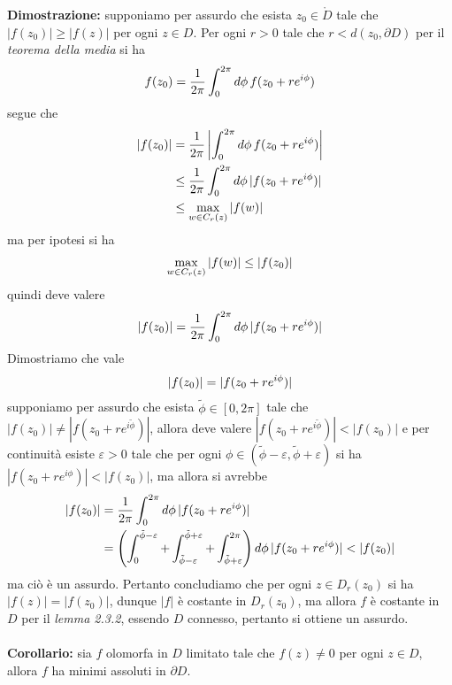 \documentclass{article}
\begin{document}
\textbf{Dimostrazione:} supponiamo per assurdo che esista $z_0 \in \mathring{D}$ tale che $|f(z_0)| \geq |f(z)|$ per ogni $z \in D$. Per ogni $r > 0$ tale che $r < d(z_0, \partial D)$ per il \textit{teorema della media}  si ha
\begin{gather}
    f(z_0) = \frac{1}{2\pi}\int_0^{2\pi}d\phi \, f(z_0 + re^{i\phi}) \notag
\end{gather}
segue che
\begin{align}
    |f(z_0)| &= \frac{1}{2\pi}\left|\int_0^{2\pi}d\phi \, f(z_0 + re^{i\phi})\right| \notag \\
    &\leq \frac{1}{2\pi}\int_0^{2\pi}d\phi \, |f(z_0 + re^{i\phi})| \notag \\
    &\leq \max_{w \in C_r(z)}|f(w)| \notag
\end{align}
ma per ipotesi si ha
\begin{gather}
    \max_{w \in C_r(z)}|f(w)| \leq |f(z_0)| \notag
\end{gather}
quindi deve valere
\begin{gather}
    |f(z_0)| = \frac{1}{2\pi}\int_0^{2\pi}d\phi \, |f(z_0 + re^{i\phi})| \notag
\end{gather}
Dimostriamo che vale
\begin{gather}
    |f(z_0)| = |f(z_0 + re^{i\phi})| \notag
\end{gather}
supponiamo per assurdo che esista $\tilde{\phi} \in [0, 2\pi]$ tale che $|f(z_0)| \neq |f(z_0 + re^{i\tilde{\phi}})|$, allora deve valere $|f(z_0 + re^{i\tilde{\phi}})| < |f(z_0)|$ e per continuità esiste $\varepsilon > 0$ tale che per ogni $\phi \in (\tilde{\phi} - \varepsilon, \tilde{\phi} + \varepsilon)$ si ha $|f(z_0 + re^{i\phi})| < |f(z_0)|$, ma allora si avrebbe
\begin{align}
    |f(z_0)| &= \frac{1}{2\pi}\int_0^{2\pi}d\phi \, |f(z_0 + re^{i\phi})| \notag \\
    &= \left(\int_0^{\tilde{\phi} - \varepsilon} + \int_{\tilde{\phi} - \varepsilon}^{\tilde{\phi} + \varepsilon} + \int_{\tilde{\phi} + \varepsilon}^{2\pi}\right)d\phi \, |f(z_0 + re^{i\phi})| < |f(z_0)| \notag
\end{align}
ma ciò è un assurdo. Pertanto concludiamo che per ogni $z \in D_r(z_0)$ si ha $|f(z)| = |f(z_0)|$, dunque $|f|$ è costante in $D_r(z_0)$, ma allora $f$ è costante in $D$ per il \textit{lemma 2.3.2}, essendo $D$ connesso, pertanto si ottiene un assurdo. \\ \\
\textbf{Corollario:} sia $f$ olomorfa in $D$ limitato tale che $f(z) \neq 0$ per ogni $z \in D$, allora $f$ ha minimi assoluti in $\partial D$. \\
\end{document}
